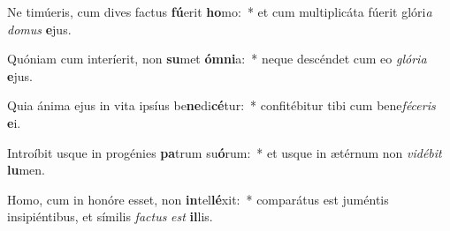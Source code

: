 \item Ne timúeris, cum dives factus \textbf{fú}erit \textbf{ho}mo:~* et cum multiplicáta fúerit glóri\textit{a} \textit{do}\textit{mus} \textbf{e}jus.
\item Quóniam cum interíerit, non \textbf{su}met \textbf{óm}\textbf{ni}a:~* neque descéndet cum eo \textit{gló}\textit{ri}\textit{a} \textbf{e}jus.
\item Quia ánima ejus in vita ipsíus be\textbf{ne}di\textbf{cé}tur:~* confitébitur tibi cum bene\textit{fé}\textit{ce}\textit{ris} \textbf{e}i.
\item Introíbit usque in progénies \textbf{pa}trum su\textbf{ó}rum:~* et usque in ætérnum non \textit{vi}\textit{dé}\textit{bit} \textbf{lu}men.
\item Homo, cum in honóre esset, non \textbf{in}tel\textbf{lé}xit:~* comparátus est juméntis insipiéntibus, et símilis \textit{fac}\textit{tus} \textit{est} \textbf{il}lis.
